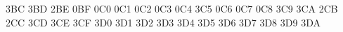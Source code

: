 { \mtsyadef@\nLeftrightarrow3BC
 \mtsyadef@\nleftrightarrow3BD
 \mtsyadef@\divideontimes2BE 
 \mtsyadef@\varnothing0BF 
 \mtsyadef@\nexists0C0
 \mtsyadef@\Finv0C1
 \mtsyadef@\Game0C2
 \mtsyadef@\mho0C3
 \mtsyadef@\eth0C4
 \mtsyadef@\eqsim3C5
 \mtsyadef@\beth0C6  
 \mtsyadef@\gimel0C7
 \mtsyadef@\daleth0C8
 \mtsyadef@\lessdot3C9
 \mtsyadef@\gtrdot3CA
 \mtsyadef@\ltimes2CB
 \mtsyadef@\rtimes2CC
 \mtsyadef@\shortmid3CD
 \mtsyadef@\shortparallel3CE
 \let\smallsetminus=\setdif
 \mtsyadef@\thicksim3CF
 \mtsyadef@\thickapprox3D0
 \mtsyadef@\approxeq3D1
 \mtsyadef@\succapprox3D2
 \mtsyadef@\precapprox3D3
 \mtsyadef@\curvearrowleft3D4
 \mtsyadef@\curvearrowright3D5
 \mtsyadef@\backepsilon3D6
 \mtsyadef@\nsqsubset3D7
 \mtsyadef@\nsqsupset3D8
 \mtsyadef@\nsqsubseteq3D9
 \mtsyadef@\nsqsupseteq3DA
}

\def\Esyadefs@{%
 \def\ulcorner{\mathopen{\hbox{\mtsya@t\char"70}}}%
 \def\urcorner{\mathclose{\hbox{\mtsya@t\char"71}}}%
 \def\llcorner{\mathopen{\hbox{\mtsya@t\char"78}}}%
 \def\lrcorner{\mathclose{\hbox{\mtsya@t\char"79}}}%
 \Emtsyadef@\checkmark@058
 \def\checkmark{\ifmmode\checkmark@\else\hbox{$\m@th\checkmark@$}\fi}%
 \Emtsyadef@\circledR@072
 \def\circledR{\ifmmode\circledR@\else\hbox{$\m@th\circledR@$}\fi}%
 \Emtsyadef@\maltese@07A
 \def\maltese{\ifmmode\maltese@\else\hbox{$\m@th\maltese@$}\fi}%
 \Emtsyadef@\midshaft039
 \Emtsyadef@\rarrowhead04B
 \Emtsyadef@\larrowhead04C
 \Emtsyadef@\dashleftarrow0DB
 \Emtsyadef@\dashrightarrow0DC
 \let\dasharrow\dashrightarrow
 \Emtsyadef@\boxdot200
 \Emtsyadef@\boxplus201
 \Emtsyadef@\boxtimes202
 \Emtsyadef@\square003
 \Emtsyadef@\blacksquare004
 \Emtsyadef@\centerdot205
 \Emtsyadef@\lozenge006
 \Emtsyadef@\blacklozenge007
 \Emtsyadef@\circlearrowright308
 \Emtsyadef@\circlearrowleft309
 \Emtsyadef@\leftrightharpoons30B
 \Emtsyadef@\boxminus20C
 \Emtsyadef@\Vdash30D
 \Emtsyadef@\Vvdash30E
 \Emtsyadef@\vDash30F
 \Emtsyadef@\twoheadrightarrow310
 \Emtsyadef@\twoheadleftarrow311
 \Emtsyadef@\leftleftarrows312
 \Emtsyadef@\rightrightarrows313
 \Emtsyadef@\upuparrows314
 \Emtsyadef@\downdownarrows315
 \Emtsyadef@\upharpoonright316
 \let\restriction\upharpoonright
 \Emtsyadef@\downharpoonright317
 \Emtsyadef@\upharpoonleft318
 \Emtsyadef@\downharpoonleft319
 \Emtsyadef@\rightarrowtail31A
 \Emtsyadef@\leftarrowtail31B
 \Emtsyadef@\leftrightarrows31C
 \Emtsyadef@\rightleftarrows31D
 \Emtsyadef@\Lsh31E
 \Emtsyadef@\Rsh31F
 \Emtsyadef@\rightsquigarrow320
 \Emtsyadef@\leftrightsquigarrow321
 \Emtsyadef@\looparrowleft322
 \Emtsyadef@\looparrowright323
 \Emtsyadef@\circeq324
 \Emtsyadef@\succsim325
}

